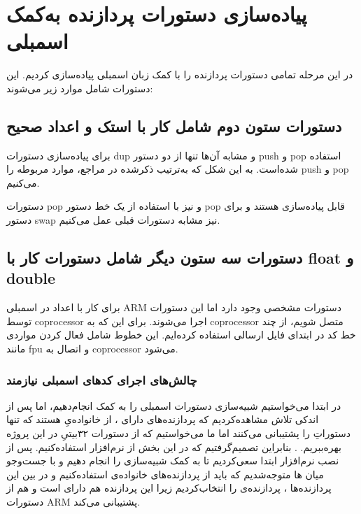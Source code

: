 \section*{پیاده‌سازی دستورات پردازنده به‌کمک
	اسمبلی
}

در این مرحله تمامی دستورات پردازنده را با کمک زبان اسمبلی
پیاده‌سازی کردیم. این دستورات شامل موارد زیر می‌شوند:

\subsection*{دستورات ستون دوم شامل کار با استک و اعداد صحیح}

برای پیاده‌سازی دستورات dup و مشابه آن‌ها تنها از دو دستور push و pop استفاده شده‌است. به این شکل که به‌ترتیب ذکرشده در مراجع، موارد مربوطه را push و pop می‌کنیم.

دستورات pop
و
نیز با استفاده از یک خط دستور pop قابل پیاده‌سازی هستند و برای دستور swap نیز مشابه دستورات قبلی عمل می‌کنیم.

\subsection*{دستورات سه ستون دیگر شامل دستورات کار با float و double}

برای کار با اعداد 
در اسمبلی
ARM دستورات مشخصی وجود دارد اما این دستورات توسط coprocessor اجرا می‌شوند. برای این که به coprocessor متصل شویم، از چند خط کد در ابتدای فایل 
ارسالی استفاده کرده‌ایم. این خطوط شامل فعال کردن مواردی مانند fpu و اتصال به coprocessor می‌شود.

\subsubsection*{چالش‌های اجرای کدهای اسمبلی نیازمند
}
در ابتدا می‌خواستیم شبیه‌سازی دستورات اسمبلی را به کمک
 انجام‌دهیم، اما پس از اندکی تلاش مشاهده‌کردیم که پردازنده‌های دارای
،
 از خانواده‌یِ
هستند که تنها دستوراتِ
  را پشتیبانی می‌کنند اما ما می‌خواستیم که از دستورات ۳۲بیتیِ
   در این پروژه بهره‌ببریم.
  .
  بنابراین تصمیم‌گرفتیم که در این بخش از نرم‌افزار
   استفاده‌کنیم. پس از نصب نرم‌افزار
 ابتدا سعی‌کردیم تا به کمک 
    شبیه‌سازی را انجام دهیم و با جست‌وجو میان
ها
 متوجه‌شدیم که باید از پردازنده‌های خانواده‌ی
 استفاده‌کنیم و در بین این پردازنده‌ها ، پردازنده‌ی
 را انتخاب‌کردیم زیرا این پردازنده هم دارای
 است و هم از دستورات ARM پشتیبانی می‌کند.

